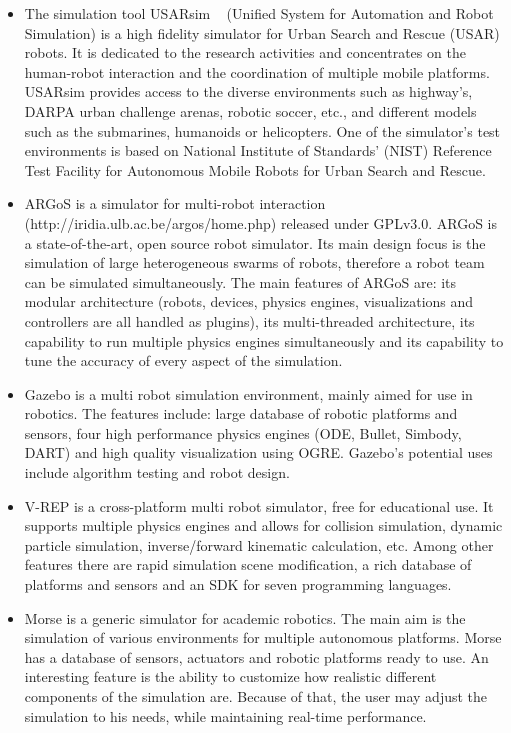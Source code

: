 \documentclass{article}
\begin{document}
\begin{itemize}
  \item The simulation tool USARsim ~\cite{Carpin2007}  (Unified System for Automation and Robot Simulation) is a high fidelity simulator for Urban Search and Rescue (USAR) robots. It is dedicated to the research activities and concentrates on the human-robot interaction and the coordination of multiple mobile platforms. USARsim provides access to the diverse environments such as highway’s, DARPA urban challenge arenas, robotic soccer, etc., and different models such as the submarines, humanoids or helicopters. One of the simulator’s test environments is based on National Institute of Standards' (NIST) Reference Test Facility for Autonomous Mobile Robots for Urban Search and Rescue.
  \item ARGoS is a simulator for multi-robot interaction (http://iridia.ulb.ac.be/argos/home.php) released under GPLv3.0.
ARGoS is a state-of-the-art, open source robot simulator. Its main design focus is the simulation of large heterogeneous swarms of robots, therefore a robot team can be simulated simultaneously.
The main features of ARGoS are: its modular architecture (robots, devices, physics engines, visualizations and controllers are all handled as plugins), its multi-threaded architecture, its capability to run multiple physics engines simultaneously and its capability to tune the accuracy of every aspect of the simulation.
  \item Gazebo is a multi robot simulation environment, mainly aimed for use in robotics.
The features include: large database of robotic platforms and sensors, four high performance physics engines (ODE, Bullet, Simbody, DART) and high quality visualization using OGRE.
Gazebo's potential uses include algorithm testing and robot design.
  \item V-REP is a cross-platform multi robot simulator, free for educational use. It supports multiple physics engines and allows for collision simulation, dynamic particle simulation, inverse/forward kinematic calculation, etc.
Among other features there are rapid simulation scene modification, a rich database of platforms and sensors and an SDK for seven programming languages.
  \item Morse is a generic simulator for academic robotics.
The main aim is the simulation of various environments for multiple autonomous platforms.
Morse has a database of sensors, actuators and robotic platforms ready to use.
An interesting feature is the ability to customize how realistic different components of the simulation are. Because of that, the user may adjust the simulation to his needs, while maintaining real-time performance.
\end{itemize}
\end{document}
